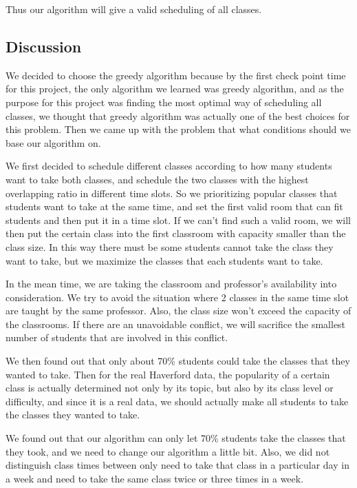 \documentclass[11pt, oneside]{article}   	%
\begin{document}
Thus our algorithm will give a valid scheduling of all classes.

\subsection{Discussion}
We decided to choose the greedy algorithm because by the first check point time for this project, the only algorithm we learned was greedy algorithm, and as the purpose for this project was finding the most optimal way of scheduling all classes, we thought that greedy algorithm was actually one of the best choices for this problem. Then we came up with the problem that what conditions should we base our algorithm on.

We first decided to schedule different classes according to how many students want to take both classes, and schedule the two classes with the highest overlapping ratio in different time slots. So we prioritizing popular classes that students want to take at the same time, and set the first valid room that can fit students and then put it in a time slot. If we can't find such a valid room, we will then put the certain class into the first classroom with capacity smaller than the class size. In this way there must be some students cannot take the class they want to take, but we maximize the classes that each students want to take.

In the mean time, we are taking the classroom and professor's availability into consideration. We try to avoid the situation where 2 classes in the same time slot are taught by the same professor. Also, the class size won't exceed the capacity of the classrooms. If there are an unavoidable conflict, we will sacrifice the smallest number of students that are involved in this conflict.

We then found out that only about 70\% students could take the classes that they wanted to take. Then for the real Haverford data, the popularity of a certain class is actually determined not only by its topic, but also by its class level or difficulty, and since it is a real data, we should actually make all students to take the classes they wanted to take. 

We found out that our algorithm can only let 70\% students take the classes that they took, and we need to change our algorithm a little bit. Also, we did not distinguish class times between only need to take that class in a particular day in a week and need to take the same class twice or three times in a week. 
\end{document}
